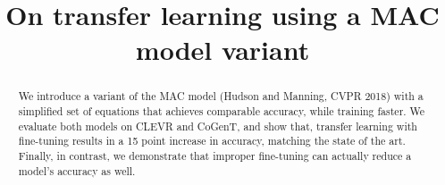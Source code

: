\documentclass{article}
\title{On transfer learning using a MAC model variant}
\author{}
\begin{document}

\maketitle

\begin{abstract}
We introduce a variant of the MAC model (Hudson and Manning, CVPR 2018) with a simplified set of equations that achieves comparable accuracy, while training faster. We evaluate both models on CLEVR and CoGenT, and show that, transfer learning with fine-tuning results in a 15 point increase in accuracy, matching the state of the art. Finally, in contrast, we demonstrate that improper fine-tuning can actually reduce a model's accuracy as well.
\end{abstract}









\newpage

\end{document}
